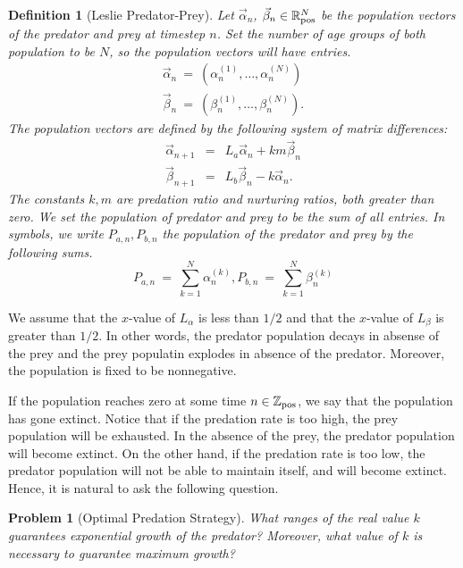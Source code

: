\documentclass[11pt,reqno]{amsart}
\numberwithin{equation}{section}
\theoremstyle{plain}
\newtheorem{definition}[thm]{Definition}
\newtheorem{problem}[thm]{Problem}
\begin{document}
\begin{definition}[Leslie Predator-Prey]
Let $\vec \alpha_n$, $\vec \beta_n \in \mathbb R_{\rm pos}^N$ be the population vectors 
of the predator and prey at timestep $n$. 
Set the number of age groups of both population to be 
$N$, so the population vectors will have entries. 
\begin{eqnarray}
    \vec \alpha_n \ = \ (\alpha_n^{(1)}, \dots, \alpha_n^{(N)}) 
    \nonumber \\
    \vec \beta_n \ = \ (\beta_n^{(1)}, \dots, \beta_n^{(N)}) .
\end{eqnarray}
 The population 
vectors are defined by the following 
system of matrix differences:
\begin{eqnarray}
    \vec \alpha_{n + 1} &=& L_a \vec \alpha_n + k m \vec \beta_n \nonumber \\ 
    \vec \beta_{n + 1} &=& L_b \vec \beta_n - k \vec \alpha_n.
\end{eqnarray}
The constants $k, m$ are predation ratio and nurturing ratios, both greater than zero. 
We set the population of predator and prey to be the sum 
of all entries. In symbols, we write $P_{a, n}, P_{b, n}$ the population 
of the predator and prey by the following sums. 
\begin{equation}
    P_{a, n} \ = \ \sum_{k = 1}^{N} \alpha^{(k)}_{n}  
    ,
    P_{b, n} \ = \ \sum_{k = 1}^{N} \beta^{(k)}_{n} 
\end{equation}
\end{definition}


We assume that the $x$-value of $L_\alpha$ is less than $1/2$ 
and that the $x$-value of $L_\beta$ is greater than $1/2$. In 
other words, the predator population decays in absense of the prey 
and the prey populatin explodes in absence of the predator. 
Moreover, the population is fixed to be nonnegative. 

If the population reaches zero 
at some time $n \in \mathbb{Z}_{\rm pos}$, 
we say that the population has gone 
extinct. 
Notice that if the predation rate is too high, the prey population 
will be exhausted. In the absence of the prey, the predator 
population will become extinct. On the other hand, if the predation 
rate is too low, the predator population will not be able to maintain 
itself, and will become extinct. Hence, it is natural to ask 
the following question. 

\begin{problem}[Optimal Predation Strategy]
What ranges of the real value $k$ guarantees exponential growth 
of the predator? Moreover, what value of $k$ is necessary to guarantee 
maximum growth?
\end{problem}
\end{document}
